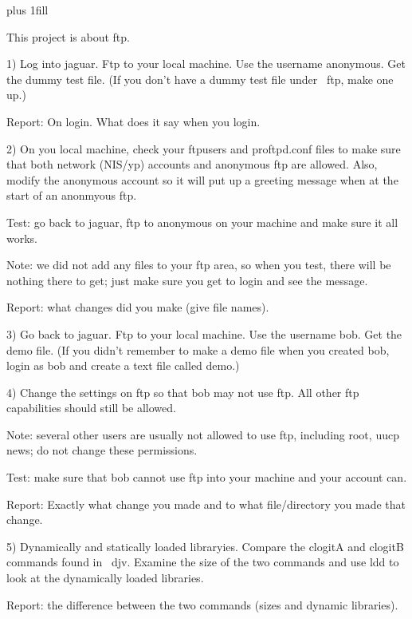 
\rightskip=0pt plus 1fill

\parindent 0pt

This project is about ftp.

1) Log into jaguar.
Ftp to your local machine.
Use the username anonymous.
Get the dummy test file.
(If you don't have a dummy test file under {\ltt{}~ftp}, make one up.)

Report: On login. What does it say when you login.

2) On you local machine, check your {\ltt{}ftpusers}
and {\ltt{}proftpd.conf} files to make sure that
both network (NIS/yp) accounts and anonymous ftp
are allowed.
Also, modify the anonymous account so it
will put up a greeting message when at the start of
an anonmyous ftp.

Test: go back to jaguar, ftp to anonymous on your machine
and make sure it all works.

Note: we did not add any files to your ftp area, so when
you test, there will be nothing there to get; just make sure
you get to login and see the message.

Report: what changes did you make (give file names).

3) Go back to jaguar.
Ftp to your local machine.
Use the username bob.
Get the {\ltt{}demo} file.
(If you didn't remember to make a demo file when you created
bob, login as bob and create a text file called demo.)

4) Change the settings on ftp so that {\ltt{}bob} may not use ftp.
All other ftp capabilities should still be allowed.

Note: several other users are usually not allowed to use ftp, including {\ltt{}root}, {\ltt{}uucp}
{\ltt{}news}; do not change these permissions.

Test: make sure that {\ltt{}bob} cannot use ftp into your machine and your
account can.

Report: Exactly what change you made and to what
file/directory you made that change.

5) Dynamically and statically loaded libraryies.
Compare the {\ltt{}clogitA} and {\ltt{}clogitB} commands found in {\ltt{}~djv}.
Examine the size of the two commands
and use {\ltt{}ldd} to look at the dynamically loaded libraries.

Report: the difference between the two commands (sizes and dynamic libraries).
\bye

